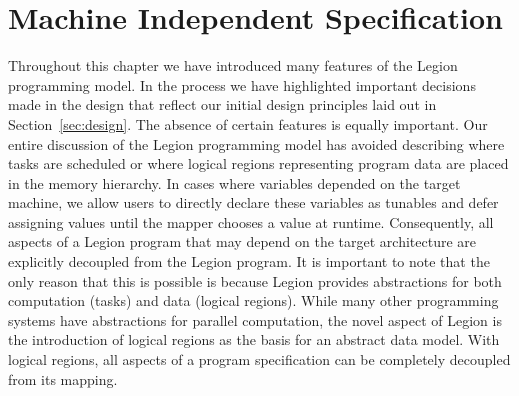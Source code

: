 \section{Machine Independent Specification}
\label{sec:indepspec}
Throughout this chapter we have introduced many 
features of the Legion programming model. In the
process we have highlighted important decisions
made in the design that reflect our initial design
principles laid out in Section~\ref{sec:design}.
The absence of certain features is equally important.
Our entire discussion 
of the Legion programming model has avoided 
describing where tasks are scheduled or where
logical regions representing program data are
placed in the memory hierarchy. In cases where
variables depended on the target machine, we
allow users to directly declare these variables
as tunables and defer assigning values until
the mapper chooses a value at runtime. Consequently,
all aspects of a Legion program that may depend
on the target architecture are explicitly decoupled
from the Legion program. It is important to note
that the only reason that this is possible is 
because Legion provides abstractions for both
computation (tasks) and data (logical regions).
While many other programming systems have abstractions
for parallel computation, the novel aspect of 
Legion is the introduction of logical regions as
the basis for an abstract data model. With logical
regions, all aspects of a program specification can
be completely decoupled from its mapping.

